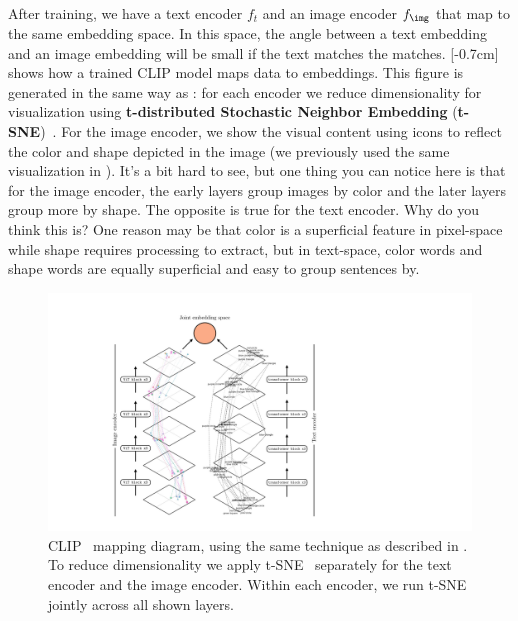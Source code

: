 After training, we have a text encoder $f_t$ and an image encoder $f_\img$ that map to the same embedding space. In this space, the angle between a text embedding and an image embedding will be small if the text matches the matches. [-0.7cm]
\Fig{\ref{fig:vision_and_language:clip_mapping_diagram_two_branch}} shows how a trained CLIP model maps data to embeddings. This figure is generated in the same way as \fig{\ref{fig:neural_nets:vit_mapping_plot}}: for each encoder we reduce dimensionality for visualization using \textbf{t-distributed Stochastic Neighbor Embedding} (\textbf{t-SNE})~\cite{tsne}. For the image encoder, we show the visual content using icons to reflect the color and shape depicted in the image (we previously used the same visualization in \sect{\ref{sec:representation_learning:expt_designing_embeddings_with_contrastive_learning}}). It's a bit hard to see, but one thing you can notice here is that for the image encoder, the early layers group images by color and the later layers group more by shape. The opposite is true for the text encoder. Why do you think this is? One reason may be that color is a superficial feature in pixel-space while shape requires processing to extract, but in text-space, color words and shape words are equally superficial and easy to group sentences by.
\begin{figure}[h]
    \centerline{
        \includegraphics[width=1.0\linewidth]{figures/vision_and_language/clip_mapping_diagram_two_branch.pdf}
    }
    \caption{CLIP~\cite{radford2021learning} mapping diagram, using the same technique as described in \chap{\ref{chapter:neural_nets_as_distribution_transformers}}. To reduce dimensionality we apply t-SNE~\cite{tsne} separately for the text encoder and the image encoder. Within each encoder, we run t-SNE jointly across all shown layers.}
    \label{fig:vision_and_language:clip_mapping_diagram_two_branch}
\end{figure}

